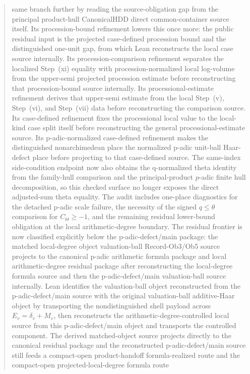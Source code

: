 \documentclass[11pt]{article}
\theoremstyle{plain}
\theoremstyle{definition}
\theoremstyle{remark}
\begin{document}
\begin{abstract}
same branch further by reading the source-obligation gap from the principal
product-hull CanonicalHDD direct common-container source itself.  Its procession-bound
refinement lowers this once more: the public residual input is the projected
case-defined procession bound
and the distinguished one-unit gap, from which Lean reconstructs the local case
source internally.  Its procession-comparison refinement separates the
localized Step~(xi) equality with procession-normalized local log-volume from
the upper-semi projected procession estimate before reconstructing that
procession-bound source internally.  Its processional-estimate refinement
derives that upper-semi estimate from the local Step~(v), Step~(vi), and
Step~(vii) data before reconstructing the comparison source.  Its
case-defined refinement fixes the processional local value to the local-kind
case split itself before reconstructing the general processional-estimate
source.  Its p-adic-normalized case-defined refinement makes the distinguished
nonarchimedean place the normalized p-adic unit-ball Haar-defect place before
projecting to that case-defined source.  The same-index side-condition
endpoint now also obtains the q-normalized theta identity from the
family-hull comparison and the principal-product \(p\)-adic finite hull
decomposition, so this checked surface no longer exposes the direct
adjusted-sum theta equality.  The audit includes one-place
diagnostics for the detached p-adic scale failure, the necessity of the signed
\(q\leq\theta\) comparison for \(C_\Theta\ge -1\), and the remaining residual
lower-bound obligation at the local arithmetic-degree boundary.  The residual
frontier is now classified explicitly below the p-adic-defect/main package:
the matched local-degree object valuation-ball Record-Ob3/Ob5 source projects
to the canonical p-adic arithmetic formula package and local arithmetic-degree
residual package after reconstructing the local-degree formula source and then
the p-adic-defect/main valuation-ball source internally.  Lean identifies the
valuation-ball object reconstructed from the p-adic-defect/main source with the
original valuation-ball additive-Haar object by transporting the
nondistinguished shell payload across \(E_v=\delta_v+M_v\), then reconstructs
the arithmetic-degree-controlled local source from this p-adic-defect/main
object and transports the controlled component.  The derived matched-object
source projects directly to the canonical residual package and the reconstructed
p-adic-defect/main source still feeds a compact-open product-handoff
formula-realized route and the compact-open projected-local-degree formula route

\end{abstract}
\end{document}
